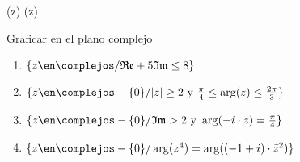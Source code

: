 \def\pReal{\mathfrak{Re}}(z) %
\def\pIm{\mathfrak{Im}}(z) %

\begin{enunciado}{\ejercicio}
Graficar en el plano complejo
\begin{enumerate}[label=\roman*)]
 \item $\{z \en \complejos / \pReal + 5\pIm \leq 8\}$
 \item $\{z \en \complejos - \{0\} / |z| \geq 2 \text{ y } \frac{\pi}{4} \leq \arg(z) \leq \frac{2\pi}{3}\}$
 \item $\{z \en \complejos - \{0\} / \pIm > 2 \text{ y } \arg(-i \cdot z) = \frac{\pi}{4}\}$
 \item $\{z \en \complejos - \{0\} / \arg(z^4) = \arg((-1 + i)\cdot \bar{z}^2)\}$
\end{enumerate}
\end{enunciado}

